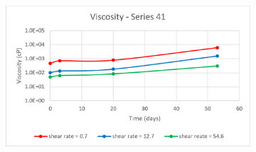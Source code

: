 \begin{appendices}
\begin{figure}
{\begin{subfigure}[b]{0.6\textwidth}
     \end{subfigure}
     \begin{subfigure}[b]{0.6\textwidth}
         \centering
         \includegraphics[width=\textwidth]{img/visc/41.png}
     \end{subfigure}
    }\\
\end{figure}
\end{appendices}
